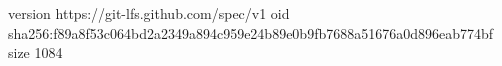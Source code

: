 version https://git-lfs.github.com/spec/v1
oid sha256:f89a8f53c064bd2a2349a894c959e24b89e0b9fb7688a51676a0d896eab774bf
size 1084
